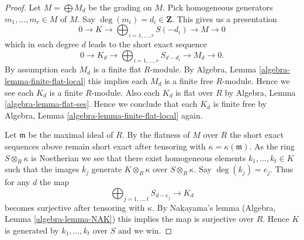 \documentclass[10pt,a4paper]{amsart}
\theoremstyle{plain}
\theoremstyle{definition}
\theoremstyle{remark}
\numberwithin{equation}{subsection}
\begin{document}
\begin{proof}
Let $M = \bigoplus M_d$ be the grading on $M$.
Pick homogeneous generators $m_1, \ldots, m_r \in M$ of $M$.
Say $\deg(m_i) = d_i \in \mathbf{Z}$. This gives us a presentation
$$
0 \to K \to \bigoplus\nolimits_{i = 1, \ldots, r} S(-d_i) \to M \to 0
$$
which in each degree $d$ leads to the short exact sequence
$$
0 \to K_d \to \bigoplus\nolimits_{i = 1, \ldots, r} S_{d - d_i} \to
M_d \to 0.
$$
By assumption each $M_d$ is a finite flat $R$-module. By
Algebra, Lemma \ref{algebra-lemma-finite-flat-local}
this implies each $M_d$ is a finite free $R$-module. Hence
we see each $K_d$ is a finite $R$-module. Also each $K_d$ is flat
over $R$ by
Algebra, Lemma \ref{algebra-lemma-flat-ses}.
Hence we conclude that each $K_d$ is finite free by
Algebra, Lemma \ref{algebra-lemma-finite-flat-local}
again.

\medskip\noindent
Let $\mathfrak m$ be the maximal ideal of $R$. By the flatness of $M$
over $R$ the short exact sequences above remain short exact after tensoring
with $\kappa = \kappa(\mathfrak m)$. As the ring $S \otimes_R \kappa$ is
Noetherian we see that there exist homogeneous elements
$k_1, \ldots, k_t \in K$ such that the images $\overline{k}_j$
generate $K \otimes_R \kappa$ over $S \otimes_R \kappa$. Say $\deg(k_j) = e_j$.
Thus for any $d$ the map
$$
\bigoplus\nolimits_{j = 1, \ldots, t} S_{d - e_j}
\longrightarrow
K_d
$$
becomes surjective after tensoring with $\kappa$. By
Nakayama's lemma
(Algebra, Lemma \ref{algebra-lemma-NAK})
this implies the map is surjective over $R$. Hence $K$ is generated
by $k_1, \ldots, k_t$ over $S$ and we win.
\end{proof}
\end{document}
